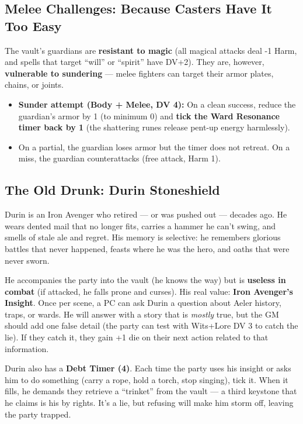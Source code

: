 \documentclass[11pt, a4paper]{article}
\begin{document}
\subsection{Melee Challenges: Because Casters Have It Too Easy}

The vault's guardians are \textbf{resistant to magic} (all magical attacks deal -1 Harm, and spells that target ``will'' or ``spirit'' have DV+2). They are, however, \textbf{vulnerable to sundering} --- melee fighters can target their armor plates, chains, or joints.

\begin{itemize}
\item \textbf{Sunder attempt (Body + Melee, DV 4):} On a clean success, reduce the guardian's armor by 1 (to minimum 0) and \textbf{tick the Ward Resonance timer back by 1} (the shattering runes release pent-up energy harmlessly).
\item On a partial, the guardian loses armor but the timer does not retreat. On a miss, the guardian counterattacks (free attack, Harm 1).
\end{itemize}

\subsection{The Old Drunk: Durin Stoneshield}

Durin is an Iron Avenger who retired --- or was pushed out --- decades ago. He wears dented mail that no longer fits, carries a hammer he can't swing, and smells of stale ale and regret. His memory is selective: he remembers glorious battles that never happened, feasts where he was the hero, and oaths that were never sworn.

He accompanies the party into the vault (he knows the way) but is \textbf{useless in combat} (if attacked, he falls prone and curses). His real value: \textbf{Iron Avenger's Insight}. Once per scene, a PC can ask Durin a question about Aeler history, traps, or wards. He will answer with a story that is \textit{mostly} true, but the GM should add one false detail (the party can test with Wits+Lore DV 3 to catch the lie). If they catch it, they gain +1 die on their next action related to that information.

Durin also has a \textbf{Debt Timer (4)}. Each time the party uses his insight or asks him to do something (carry a rope, hold a torch, stop singing), tick it. When it fills, he demands they retrieve a ``trinket'' from the vault --- a third keystone that he claims is his by rights. It's a lie, but refusing will make him storm off, leaving the party trapped.
\end{document}
